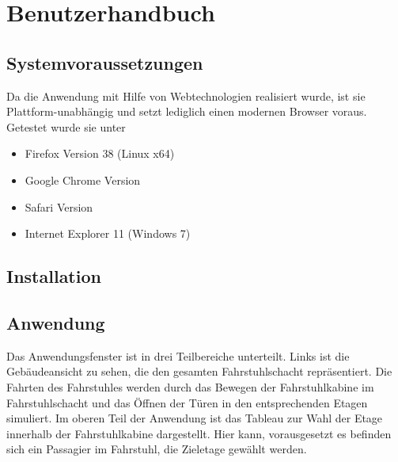\part{Benutzerhandbuch}

\chapter{Systemvoraussetzungen}
Da die Anwendung mit Hilfe von Webtechnologien realisiert wurde, ist sie Plattform-unabhängig und setzt lediglich einen modernen Browser  voraus. Getestet wurde sie unter
\begin{itemize}
 \item Firefox Version 38 (Linux x64)
 \item Google Chrome Version 
 \item Safari Version 
 \item Internet Explorer 11 (Windows 7) 
\end{itemize}
\chapter{Installation}
\chapter{Anwendung}
Das Anwendungsfenster ist in drei Teilbereiche unterteilt. Links ist die Gebäude\-ansicht zu sehen, die den gesamten Fahrstuhlschacht repräsentiert. Die Fahrten des Fahrstuhles werden durch das Bewegen der Fahrstuhlkabine im Fahrstuhlschacht und das Öffnen der Türen in den entsprechenden Etagen simuliert.
Im oberen Teil der Anwendung ist das Tableau zur Wahl der Etage innerhalb der Fahrstuhlkabine dargestellt. Hier kann, vorausgesetzt es befinden sich ein Passagier im Fahrstuhl, die Zieletage gewählt werden.

